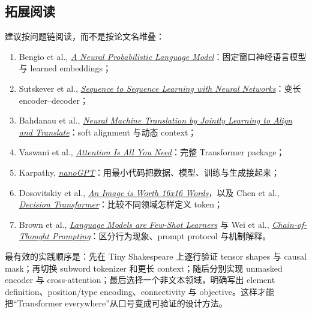 \documentclass[a4paper]{article}
\begin{document}
\subsection{拓展阅读}

建议按问题链阅读，而不是按论文名堆叠：

\begin{enumerate}
  \item Bengio et al., \href{https://www.jmlr.org/papers/v3/bengio03a.html}{\emph{A Neural Probabilistic Language Model}}：固定窗口神经语言模型与 learned embeddings；
  \item Sutskever et al., \href{https://proceedings.neurips.cc/paper/2014/hash/a14ac55a4f27472c5d894ec1c3c743d2-Abstract.html}{\emph{Sequence to Sequence Learning with Neural Networks}}：变长 encoder--decoder；
  \item Bahdanau et al., \href{https://arxiv.org/abs/1409.0473}{\emph{Neural Machine Translation by Jointly Learning to Align and Translate}}：soft alignment 与动态 context；
  \item Vaswani et al., \href{https://arxiv.org/abs/1706.03762}{\emph{Attention Is All You Need}}：完整 Transformer package；
  \item Karpathy, \href{https://github.com/karpathy/nanoGPT}{\emph{nanoGPT}}：用最小代码把数据、模型、训练与生成接起来；
  \item Dosovitskiy et al., \href{https://arxiv.org/abs/2010.11929}{\emph{An Image is Worth 16x16 Words}}，以及 Chen et al., \href{https://arxiv.org/abs/2106.01345}{\emph{Decision Transformer}}：比较不同领域怎样定义 token；
  \item Brown et al., \href{https://arxiv.org/abs/2005.14165}{\emph{Language Models are Few-Shot Learners}} 与 Wei et al., \href{https://arxiv.org/abs/2201.11903}{\emph{Chain-of-Thought Prompting}}：区分行为现象、prompt protocol 与机制解释。
\end{enumerate}

最有效的实践顺序是：先在 Tiny Shakespeare 上逐行验证 tensor shapes 与 causal mask；再切换 subword tokenizer 和更长 context；随后分别实现 unmasked encoder 与 cross-attention；最后选择一个非文本领域，明确写出 element definition、position/type encoding、connectivity 与 objective。这样才能把“Transformer everywhere”从口号变成可验证的设计方法。
\end{document}
